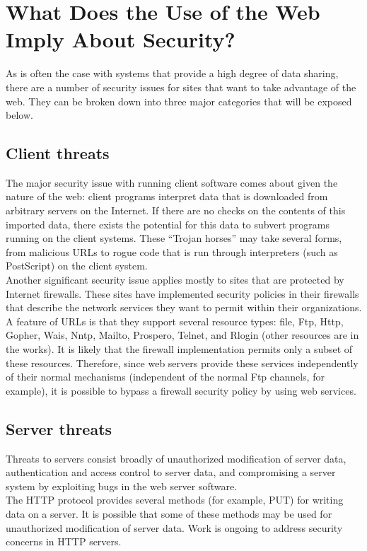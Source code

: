 \section{What Does the Use of the Web Imply About Security?}
As is often the case with systems that provide a high degree of data
sharing, there are a number of security issues for sites that want to
take advantage of the web. They can be broken down into three major
categories that will be exposed below.

\subsection{Client threats}
The major security issue with running client software comes about given
the nature of the web: client programs interpret data that is
downloaded from arbitrary servers on the Internet. If there are no
checks on the contents of this imported data, there exists the
potential for this data to subvert programs running on the client
systems. These ``Trojan horses'' may take several forms, from malicious
URLs to rogue code that is run through interpreters (such as
PostScript) on the client system.\\

Another significant security issue applies mostly to sites that are
protected by Internet firewalls. These sites have implemented security
policies in their firewalls that describe the network services they
want to permit within their organizations. A feature of URLs is that
they support several resource types: file, Ftp, Http, Gopher, Wais,
Nntp, Mailto, Prospero, Telnet, and Rlogin (other resources are in the
works). It is likely that the firewall implementation permits only a
subset of these resources. Therefore, since web servers provide these
services independently of their normal mechanisms (independent of the
normal Ftp channels, for example), it is possible to bypass a firewall
security policy by using web services.

\subsection{Server threats}
Threats to servers consist broadly of unauthorized modification of
server data, authentication and access control to server data, and
compromising a server system by exploiting bugs in the web server
software.\\

The HTTP protocol provides several methods (for example, PUT) for
writing data on a server. It is possible that some of these methods may
be used for unauthorized modification of server data. Work is ongoing
to address security concerns in HTTP servers.

